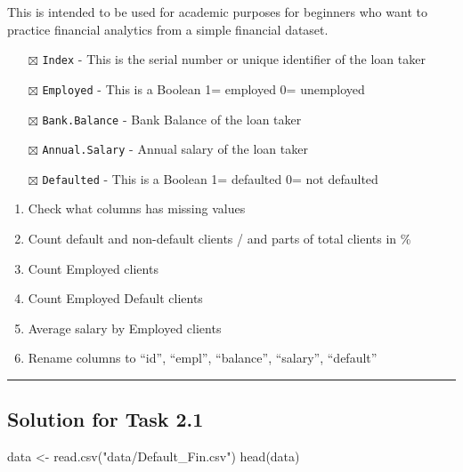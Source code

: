 \documentclass[
]{book}
\newenvironment{Shaded}{\begin{snugshade}}{\end{snugshade}}
\newcommand{\FunctionTok}[1]{\textcolor[rgb]{0.00,0.00,0.00}{#1}}
\newcommand{\NormalTok}[1]{#1}
\newcommand{\OtherTok}[1]{\textcolor[rgb]{0.56,0.35,0.01}{#1}}
\newcommand{\StringTok}[1]{\textcolor[rgb]{0.31,0.60,0.02}{#1}}
\providecommand{\tightlist}{%
  \setlength{\itemsep}{0pt}\setlength{\parskip}{0pt}}
\begin{document}
This is intended to be used for academic purposes for beginners who want to practice financial analytics from a simple financial dataset.

\begin{itemize}
\tightlist
\item[$\boxtimes$]
  \texttt{Index} - This is the serial number or unique identifier of the loan taker
\item[$\boxtimes$]
  \texttt{Employed} - This is a Boolean 1= employed 0= unemployed
\item[$\boxtimes$]
  \texttt{Bank.Balance} - Bank Balance of the loan taker
\item[$\boxtimes$]
  \texttt{Annual.Salary} - Annual salary of the loan taker\\
\item[$\boxtimes$]
  \texttt{Defaulted} - This is a Boolean 1= defaulted 0= not defaulted
\end{itemize}

\begin{enumerate}
\def\labelenumi{\arabic{enumi}.}
\tightlist
\item
  Check what columns has missing values
\item
  Count default and non-default clients / and parts of total clients in \%
\item
  Count Employed clients
\item
  Count Employed Default clients
\item
  Average salary by Employed clients
\item
  Rename columns to ``id'', ``empl'', ``balance'', ``salary'', ``default''
\end{enumerate}

\begin{center}\rule{0.5\linewidth}{0.5pt}\end{center}

\hypertarget{chapter442}{%
\subsection{Solution for Task 2.1}\label{chapter442}}

\begin{Shaded}
\begin{Highlighting}[]
\NormalTok{data }\OtherTok{\textless{}{-}} \FunctionTok{read.csv}\NormalTok{(}\StringTok{"data/Default\_Fin.csv"}\NormalTok{)}
\FunctionTok{head}\NormalTok{(data)}
\end{Highlighting}
\end{Shaded}
\end{document}
